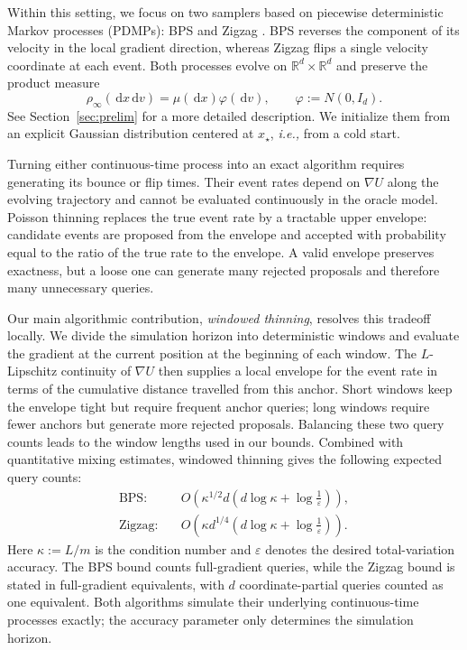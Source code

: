 \documentclass{amsart}
\theoremstyle{plain}
\theoremstyle{definition}
\theoremstyle{remark}
\newcommand{\ud}{\,\mathrm{d}}
\newcommand{\RR}{\mathbb{R}}
\newcommand{\R}{\RR}
\newcommand{\1}{\mathbf 1}
\newcommand{\dd}{\ud}
\begin{document}
Within this setting, we focus on two samplers based on piecewise deterministic
Markov processes (PDMPs): BPS \cite{BouchardCoteVollmerDoucet} and Zigzag
\cite{BierkensFearnheadRoberts}.  BPS reverses the component of its velocity
in the local gradient direction, whereas Zigzag flips a single velocity
coordinate at each event.
Both processes evolve on
$\R^d\times\R^d$ and preserve the product measure
\[
        \rho_\infty(\dd x\dd v)=\mu(\dd x)\varphi(\dd v),
        \qquad \varphi:=N(0,I_d).
\]  
See Section~\ref{sec:prelim} for a more detailed description.
We initialize them from an explicit Gaussian distribution centered at
$x_\star$, \textit{i.e.,} from a cold start.

Turning either continuous-time process into an exact algorithm requires
generating its bounce or flip times.  Their event rates depend on $\nabla U$
along the evolving trajectory and cannot be evaluated continuously in the
oracle model.  Poisson thinning \cite{LewisShedler1979} replaces the true
event rate by a tractable upper envelope: candidate events are proposed from
the envelope and accepted with probability equal to the ratio of the true
rate to the envelope.  A valid envelope preserves exactness, but a loose one can
generate many rejected proposals and therefore many unnecessary queries.

Our main algorithmic contribution, \emph{windowed thinning}, resolves this
tradeoff locally.  We divide the simulation horizon into deterministic
windows and evaluate the gradient at the current position at the beginning
of each window.  The $L$-Lipschitz continuity of $\nabla U$ then supplies a local envelope for
the event rate in terms of the cumulative distance travelled from this anchor.
Short windows keep the envelope tight but require frequent anchor queries;
long windows require fewer anchors but generate more rejected proposals.
Balancing these two query counts leads to the window lengths used in our
bounds.  Combined with quantitative
mixing estimates, windowed thinning gives the following expected query counts:
\begin{align*}
\text{BPS:}\quad&
        O\!\left(\kappa^{1/2}d
        \left(d\log\kappa+\log\tfrac1\varepsilon\right)\right),\\
\text{Zigzag:}\quad&
        O\!\left(\kappa d^{1/4}
        \left(d\log\kappa+\log\tfrac1\varepsilon\right)\right).
\end{align*}
Here $\kappa:=L/m$ is the condition number and $\varepsilon$
denotes the desired total-variation accuracy.
The BPS bound counts full-gradient queries, while the Zigzag bound is stated in
full-gradient equivalents, with $d$ coordinate-partial queries counted as one
equivalent.  Both algorithms simulate their underlying continuous-time
processes exactly; the accuracy parameter only determines the simulation
horizon.
\end{document}
